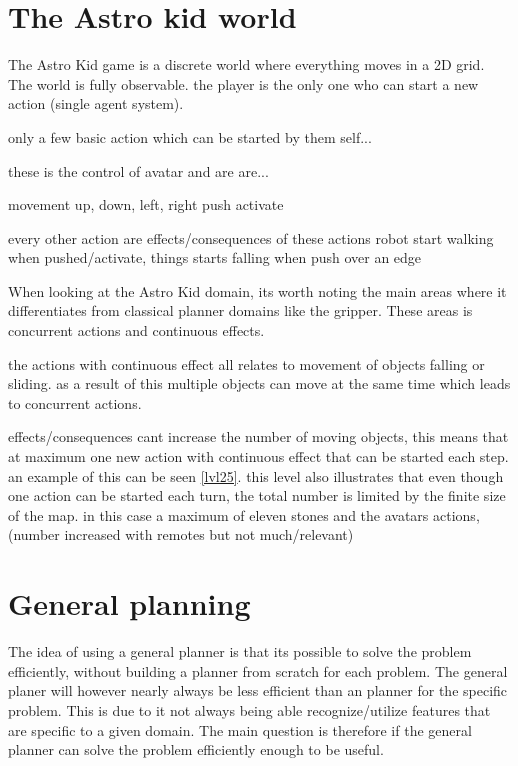 	\section{The Astro kid world}
	The Astro Kid game is a discrete world where everything moves in a 2D grid. The world is fully observable.
	the player is the only one who can start a new action (single agent system). 
	
	only a few basic action which can be started by them self...
	
	these is the control of avatar and are are...
	
		movement
			up, down, left, right 
		push
		activate
	
	every other action are effects/consequences of these actions
		robot start walking when pushed/activate, things starts falling when push over an edge
	
	
	
	When looking at the Astro Kid domain, its worth noting the main areas where it differentiates from classical planner domains like the gripper. These areas is concurrent actions and continuous effects. 

	the actions with continuous effect all relates to movement of objects falling or sliding. 
	as a result of this multiple objects can move at the same time which leads to concurrent actions.
	
	effects/consequences cant increase the number of moving objects, this means that at maximum one new action with continuous effect that can be started each step. an example of this can be seen \ref{lvl25}. this level also illustrates that even though one action can be started each turn, the total number is limited by the finite size of the map. in this case a maximum of eleven stones and the avatars actions, (number increased with remotes but not much/relevant)

\section{General planning}
	The idea of using a general planner is that its possible to solve the problem efficiently, without building a planner from scratch for each problem. The general planer will however nearly always be less efficient than an planner for the specific problem. This is due to it not always being able recognize/utilize features that are specific to a given domain. The main question is therefore if the general planner can solve the problem efficiently enough to be useful.

